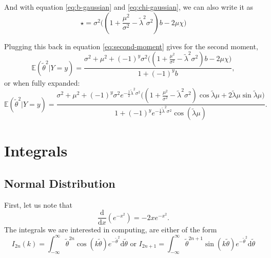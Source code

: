 \documentclass[]{report}
\begin{document}
And with equation \eqref{eq:b-gaussian} and \eqref{eq:chi-gaussian}, we can also write it as
\begin{equation}
    \star = \sigma^2\Big( (1 + \frac{\mu^2}{\sigma^2} - \tilde{\lambda}^2\sigma^2)b -2\mu \chi\Big)
\end{equation}

Plugging this back in equation \eqref{eq:second-moment} gives for the second moment,
\begin{equation}
    \mathbb{E}(\tilde{\theta}^2 | Y=y) = \frac{\sigma^2 + \mu^2+ (-1)^y \sigma^2\Big( (1 + \frac{\mu^2}{\sigma^2} - \tilde{\lambda}^2\sigma^2)b -2\mu \chi\Big)}{1+(-1)^yb},
\end{equation}
or when fully expanded:
\begin{equation}
    \mathbb{E}(\tilde{\theta}^2 | Y=y) = \frac{\sigma^2 + \mu^2+ (-1)^y \sigma^2 e^{-\frac{1}{2}\tilde{\lambda}^2\sigma^2}\Big((1 + \frac{\mu^2}{\sigma^2} - \tilde{\lambda}^2\sigma^2)\cos{\tilde{\lambda} \mu} + 2\tilde{\lambda} \mu \sin{\tilde{\lambda} \mu}\Big)}{1+(-1)^ye^{-\frac{1}{2}\tilde{\lambda}^2\sigma^2}\cos(\tilde{\lambda}\mu)}.
\end{equation}


\appendix

\chapter{Integrals}
\section{Normal Distribution}
First, let us note that
\[
\frac{\text{d}}{\text{d}x}(e^{- x^2}) = - 2 x e^{ - x ^2}
.\]
The integrals we are interested in computing, are either of the form
\[
	I_{2n}(k) = \int_{- \infty}^{\infty} \tilde{\theta}^{2n} \cos (k \tilde{\theta}) e^{ - \tilde{\theta}^2}\text{d}\tilde{\theta} \text{ or } I_{2n + 1} = \int_{- \infty}^{\infty} \tilde{\theta}^{2n + 1} \sin (k \tilde{\theta}) e^{ - \tilde{\theta}^2}\text{d} \tilde{\theta}
\]



\end{document}

